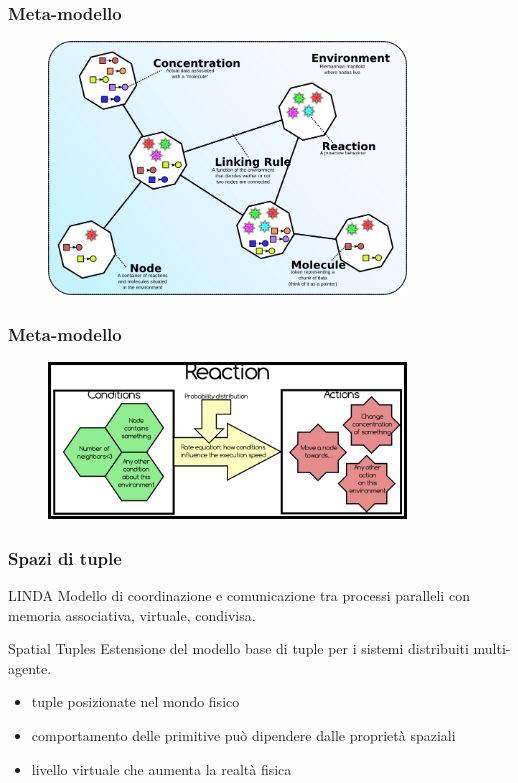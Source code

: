 \documentclass[handout]{beamer}\mode<presentation>{\usetheme{AMSCesenaBleu}}
\begin{document}
\begin{frame}
\frametitle{Meta-modello}
\begin{figure}
\includegraphics[width=9.5cm]{images/alchemistModel.png}
\end{figure}
\end{frame}

\begin{frame}
\frametitle{Meta-modello}
\begin{figure}
\includegraphics[width=9.5cm]{images/alchemistReaction.png}
\end{figure}
\end{frame}



\begin{frame}
\frametitle{Spazi di tuple}
\begin{block}{LINDA}
Modello di coordinazione e comunicazione tra processi paralleli con memoria associativa, virtuale, condivisa.
\end{block}
\begin{block}{Spatial Tuples}
Estensione del modello base di tuple per i sistemi distribuiti multi-agente.
\\
\begin{itemize}
\item tuple posizionate nel mondo fisico
\item comportamento delle primitive può dipendere dalle proprietà spaziali
\item livello virtuale che aumenta la realtà fisica
\end{itemize}

\end{block}
\end{frame}
\end{document}
